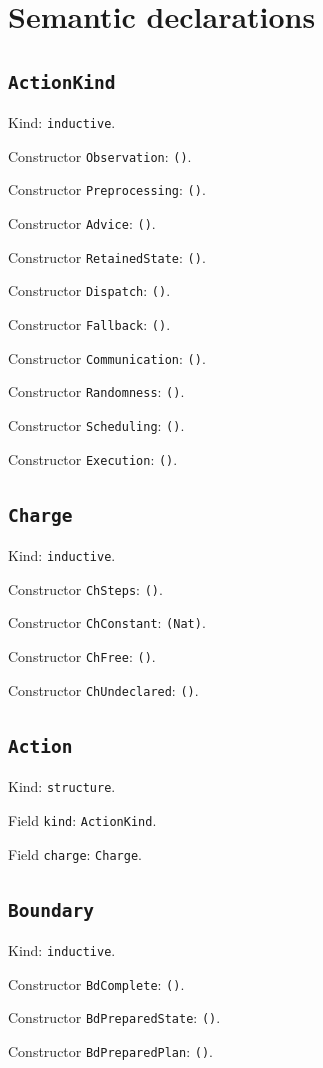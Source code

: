 \documentclass[11pt]{article}
\begin{document}
\section*{Semantic declarations}
\subsection*{\texttt{ActionKind}}
\noindent Kind: \texttt{inductive}.\par
\noindent Constructor \texttt{Observation}: \texttt{()}.\par
\noindent Constructor \texttt{Preprocessing}: \texttt{()}.\par
\noindent Constructor \texttt{Advice}: \texttt{()}.\par
\noindent Constructor \texttt{RetainedState}: \texttt{()}.\par
\noindent Constructor \texttt{Dispatch}: \texttt{()}.\par
\noindent Constructor \texttt{Fallback}: \texttt{()}.\par
\noindent Constructor \texttt{Communication}: \texttt{()}.\par
\noindent Constructor \texttt{Randomness}: \texttt{()}.\par
\noindent Constructor \texttt{Scheduling}: \texttt{()}.\par
\noindent Constructor \texttt{Execution}: \texttt{()}.\par
\subsection*{\texttt{Charge}}
\noindent Kind: \texttt{inductive}.\par
\noindent Constructor \texttt{ChSteps}: \texttt{()}.\par
\noindent Constructor \texttt{ChConstant}: \texttt{(Nat)}.\par
\noindent Constructor \texttt{ChFree}: \texttt{()}.\par
\noindent Constructor \texttt{ChUndeclared}: \texttt{()}.\par
\subsection*{\texttt{Action}}
\noindent Kind: \texttt{structure}.\par
\noindent Field \texttt{kind}: \texttt{ActionKind}.\par
\noindent Field \texttt{charge}: \texttt{Charge}.\par
\subsection*{\texttt{Boundary}}
\noindent Kind: \texttt{inductive}.\par
\noindent Constructor \texttt{BdComplete}: \texttt{()}.\par
\noindent Constructor \texttt{BdPreparedState}: \texttt{()}.\par
\noindent Constructor \texttt{BdPreparedPlan}: \texttt{()}.\par
\end{document}
